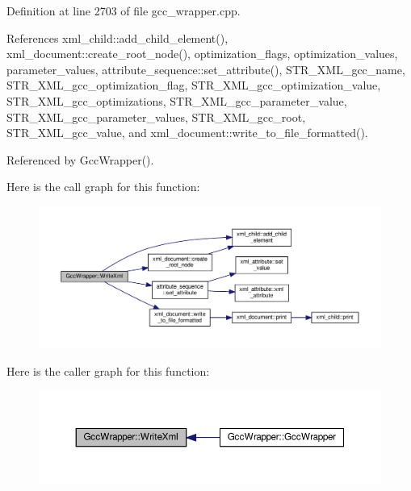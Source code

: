 Definition at line 2703 of file gcc\+\_\+wrapper.\+cpp.



References xml\+\_\+child\+::add\+\_\+child\+\_\+element(), xml\+\_\+document\+::create\+\_\+root\+\_\+node(), optimization\+\_\+flags, optimization\+\_\+values, parameter\+\_\+values, attribute\+\_\+sequence\+::set\+\_\+attribute(), S\+T\+R\+\_\+\+X\+M\+L\+\_\+gcc\+\_\+name, S\+T\+R\+\_\+\+X\+M\+L\+\_\+gcc\+\_\+optimization\+\_\+flag, S\+T\+R\+\_\+\+X\+M\+L\+\_\+gcc\+\_\+optimization\+\_\+value, S\+T\+R\+\_\+\+X\+M\+L\+\_\+gcc\+\_\+optimizations, S\+T\+R\+\_\+\+X\+M\+L\+\_\+gcc\+\_\+parameter\+\_\+value, S\+T\+R\+\_\+\+X\+M\+L\+\_\+gcc\+\_\+parameter\+\_\+values, S\+T\+R\+\_\+\+X\+M\+L\+\_\+gcc\+\_\+root, S\+T\+R\+\_\+\+X\+M\+L\+\_\+gcc\+\_\+value, and xml\+\_\+document\+::write\+\_\+to\+\_\+file\+\_\+formatted().



Referenced by Gcc\+Wrapper().

Here is the call graph for this function\+:
\nopagebreak
\begin{figure}[H]
\begin{center}
\leavevmode
\includegraphics[width=350pt]{d4/dbf/classGccWrapper_a34ebfe793ec69e13bea2d0996d3c9bcd_cgraph}
\end{center}
\end{figure}
Here is the caller graph for this function\+:
\nopagebreak
\begin{figure}[H]
\begin{center}
\leavevmode
\includegraphics[width=350pt]{d4/dbf/classGccWrapper_a34ebfe793ec69e13bea2d0996d3c9bcd_icgraph}
\end{center}
\end{figure}


